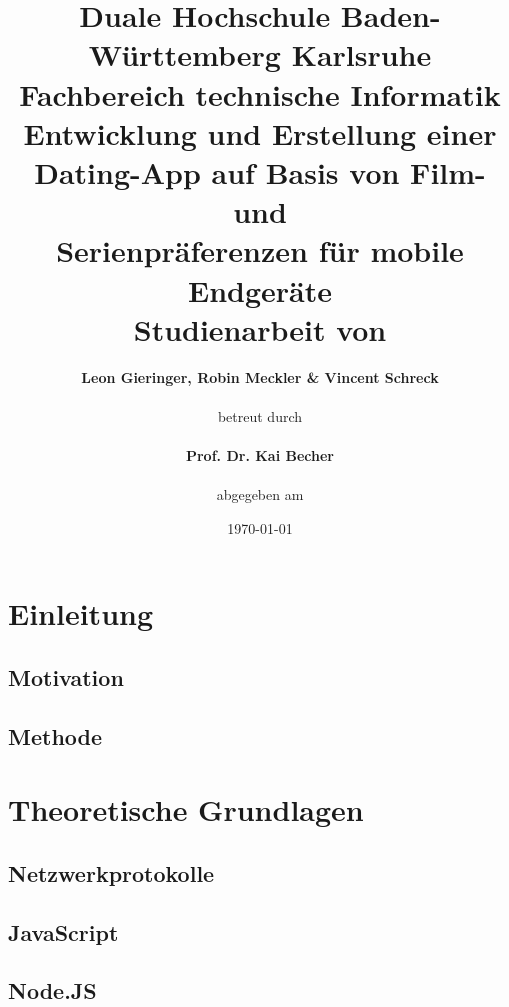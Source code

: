 \documentclass[11pt,a4paper]{article}
\title{\normalsize{Duale Hochschule Baden-Württemberg Karlsruhe}\\
		Fachbereich technische Informatik\\ \vspace{2cm}
		\huge{\textbf{Entwicklung und Erstellung einer }}\\
		\textbf{Dating-App auf Basis von Film- und }\\
		\textbf{Serienpräferenzen für mobile Endgeräte}\\ \vspace{2cm}
		\normalsize{Studienarbeit} von\\
		}
\author{\textbf{Leon Gieringer, Robin Meckler \& Vincent Schreck} \\ \vspace{2cm} \\
		betreut durch \\ \\
		\textbf{Prof. Dr. Kai Becher} \\ \vspace{2cm} \\
		abgegeben am
		}
\date{\today}
\begin{document}
\maketitle
\thispagestyle{empty}
\newpage
{}
\tableofcontents
\newpage
\listoffigures
\newpage
\listoftables
\newpage
\lstlistoflistings
\newpage
{}



\pagestyle{fancy}
\fancyhf{}
\setlength{\headheight}{35pt}

\renewcommand\headrulewidth{0.4pt}

\fancyhead[LE,RO]{\rightmark}%
\renewcommand{\sectionmark}[1]{\markright{#1}}
\renewcommand{\subsectionmark}[1]{\markright{#1}}
\renewcommand{\subsubsectionmark}[1]{\markright{#1}}

\cfoot{\thepage}


\clearpage
\section{Einleitung}
\label{sec:einleitung}

\subsection{Motivation}

\subsection{Methode}


\clearpage
\section{Theoretische Grundlagen}
\subsection{Netzwerkprotokolle}


\clearpage
\subsection{JavaScript}


\clearpage
\subsection{Node.JS}

%
\end{document}
